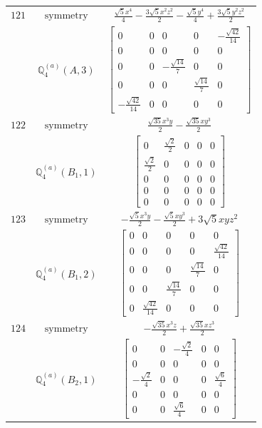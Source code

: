 \documentclass[fleqn,8pt,landscape]{jsarticle}
\begin{document}
\begin{longtable}{ccc}
$ 121 $ & $ \text{symmetry} $ & $ \frac{\sqrt{5} x^{4}}{4} - \frac{3 \sqrt{5} x^{2} z^{2}}{2} - \frac{\sqrt{5} y^{4}}{4} + \frac{3 \sqrt{5} y^{2} z^{2}}{2} $ \\
$  $ & $ \mathbb{Q}_{4}^{(a)}(A,3) $ & $ \begin{bmatrix} 0 & 0 & 0 & 0 & - \frac{\sqrt{42}}{14} \\ 0 & 0 & 0 & 0 & 0 \\ 0 & 0 & - \frac{\sqrt{14}}{7} & 0 & 0 \\ 0 & 0 & 0 & \frac{\sqrt{14}}{7} & 0 \\ - \frac{\sqrt{42}}{14} & 0 & 0 & 0 & 0 \end{bmatrix} $ \\ \hline
$ 122 $ & $ \text{symmetry} $ & $ \frac{\sqrt{35} x^{3} y}{2} - \frac{\sqrt{35} x y^{3}}{2} $ \\
$  $ & $ \mathbb{Q}_{4}^{(a)}(B_{1},1) $ & $ \begin{bmatrix} 0 & \frac{\sqrt{2}}{2} & 0 & 0 & 0 \\ \frac{\sqrt{2}}{2} & 0 & 0 & 0 & 0 \\ 0 & 0 & 0 & 0 & 0 \\ 0 & 0 & 0 & 0 & 0 \\ 0 & 0 & 0 & 0 & 0 \end{bmatrix} $ \\ \hline
$ 123 $ & $ \text{symmetry} $ & $ - \frac{\sqrt{5} x^{3} y}{2} - \frac{\sqrt{5} x y^{3}}{2} + 3 \sqrt{5} x y z^{2} $ \\
$  $ & $ \mathbb{Q}_{4}^{(a)}(B_{1},2) $ & $ \begin{bmatrix} 0 & 0 & 0 & 0 & 0 \\ 0 & 0 & 0 & 0 & \frac{\sqrt{42}}{14} \\ 0 & 0 & 0 & \frac{\sqrt{14}}{7} & 0 \\ 0 & 0 & \frac{\sqrt{14}}{7} & 0 & 0 \\ 0 & \frac{\sqrt{42}}{14} & 0 & 0 & 0 \end{bmatrix} $ \\ \hline
$ 124 $ & $ \text{symmetry} $ & $ - \frac{\sqrt{35} x^{3} z}{2} + \frac{\sqrt{35} x z^{3}}{2} $ \\
$  $ & $ \mathbb{Q}_{4}^{(a)}(B_{2},1) $ & $ \begin{bmatrix} 0 & 0 & - \frac{\sqrt{2}}{4} & 0 & 0 \\ 0 & 0 & 0 & 0 & 0 \\ - \frac{\sqrt{2}}{4} & 0 & 0 & 0 & \frac{\sqrt{6}}{4} \\ 0 & 0 & 0 & 0 & 0 \\ 0 & 0 & \frac{\sqrt{6}}{4} & 0 & 0 \end{bmatrix} $ \\ \hline

\end{longtable}
\end{document}
